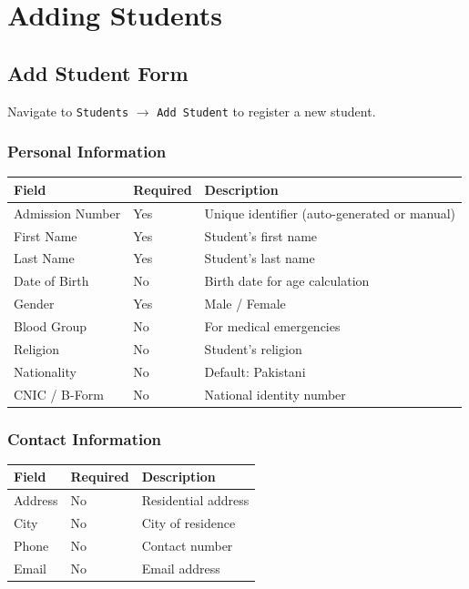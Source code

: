\documentclass[12pt,a4paper]{report}
\begin{document}
\chapter{Adding Students}

\section{Add Student Form}

Navigate to \texttt{Students} $\rightarrow$ \texttt{Add Student} to register a new student.

\subsection{Personal Information}

\begin{longtable}{@{}p{4cm}p{3cm}p{6cm}@{}}
\toprule
\textbf{Field} & \textbf{Required} & \textbf{Description} \\
\midrule
\endhead
Admission Number & Yes & Unique identifier (auto-generated or manual) \\
First Name & Yes & Student's first name \\
Last Name & Yes & Student's last name \\
Date of Birth & No & Birth date for age calculation \\
Gender & Yes & Male / Female \\
Blood Group & No & For medical emergencies \\
Religion & No & Student's religion \\
Nationality & No & Default: Pakistani \\
CNIC / B-Form & No & National identity number \\
\bottomrule
\end{longtable}

\subsection{Contact Information}

\begin{longtable}{@{}p{4cm}p{3cm}p{6cm}@{}}
\toprule
\textbf{Field} & \textbf{Required} & \textbf{Description} \\
\midrule
\endhead
Address & No & Residential address \\
City & No & City of residence \\
Phone & No & Contact number \\
Email & No & Email address \\
\bottomrule
\end{longtable}
\end{document}

